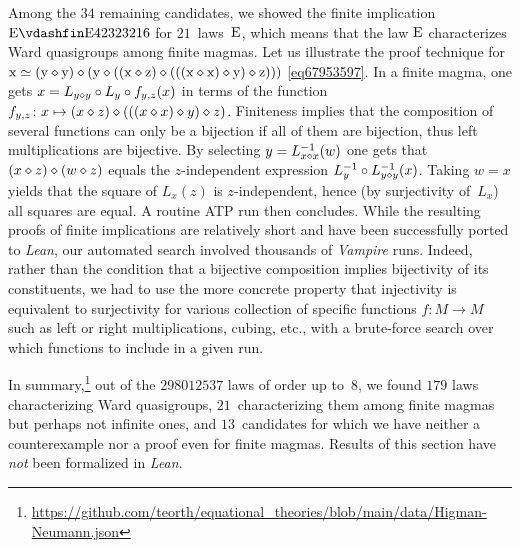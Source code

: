 Among the $34$ remaining candidates, we showed the finite implication $\E\vdashfin\Eq{42323216}$ for $21$~laws~$\mathrm{E}$, which means that the law $\mathrm{E}$ characterizes Ward quasigroups among finite magmas.  Let us illustrate the proof technique for $\mathrm{x} \simeq (\mathrm{y} \diamond \mathrm{y}) \diamond (\mathrm{y} \diamond ((\mathrm{x} \diamond \mathrm{z}) \diamond (((\mathrm{x} \diamond \mathrm{x}) \diamond \mathrm{y}) \diamond \mathrm{z})))$ \eqref{eq67953597}.  In a finite magma, one gets $x = L_{y\diamond y} \circ L_y \circ f_{y,z}(x)$ in terms of the function $f_{y,z}\colon x \mapsto (x\diamond z) \diamond (((x \diamond x) \diamond y) \diamond z)$.  Finiteness implies that the composition of several functions can only be a bijection if all of them are bijection, thus left multiplications are bijective.  By selecting $y=L_{x\diamond x}^{-1}(w)$ one gets that $(x\diamond z)\diamond (w\diamond z)$ equals the $z$-independent expression $L_y^{-1} \circ L_{y\diamond y}^{-1}(x)$.  Taking $w=x$ yields that the square of $L_x(z)$ is $z$-independent, hence (by surjectivity of~$L_x$) all squares are equal.  A routine ATP run then concludes.
While the resulting proofs of finite implications are relatively short and have been successfully ported to \emph{Lean}, our automated search involved thousands of \emph{Vampire} runs.
Indeed, rather than the condition that a bijective composition implies bijectivity of its constituents, we had to use the more concrete property that injectivity is equivalent to surjectivity for various collection of specific functions $f\colon M\to M$ such as left or right multiplications, cubing, etc.\@, with a brute-force search over which functions to include in a given run.

In summary,\footnote{\url{https://github.com/teorth/equational_theories/blob/main/data/Higman-Neumann.json}} out of the $\num{298012537}$ laws of order up to~$8$, we found $179$ laws characterizing Ward quasigroups, $21$~characterizing them among finite magmas but perhaps not infinite ones, and $13$~candidates for which we have neither a counterexample nor a proof even for finite magmas.  Results of this section have \emph{not} been formalized in \emph{Lean}.

